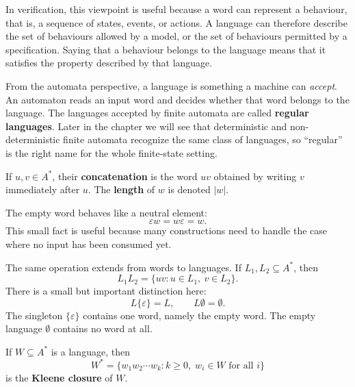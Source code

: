 In verification, this viewpoint is useful because a word can represent a
behaviour, that is, a sequence of states, events, or actions. A language
can therefore describe the set of behaviours allowed by a model, or the
set of behaviours permitted by a specification. Saying that a behaviour
belongs to the language means that it satisfies the property described by
that language.

From the automata perspective, a language is something a machine can
\emph{accept}.  An automaton reads an input word and decides whether that
word belongs to the language.  The languages accepted by finite automata
are called \textbf{regular languages}.  Later in the chapter we will see
that deterministic and non-deterministic finite automata recognize the
same class of languages, so ``regular'' is the right name for the whole
finite-state setting.


\begin{definition}
\label{def:word-ops}
If $u,v\in A^*$, their \textbf{concatenation} is the word $uv$
obtained by writing $v$ immediately after $u$.  The \textbf{length} of
$w$ is denoted $|w|$.
\end{definition}


The empty word behaves like a neutral element:
\[
  \varepsilon w = w\varepsilon = w.
\]
This small fact is useful because many constructions need to handle the
case where no input has been consumed yet.

The same operation extends from words to languages.  If
$L_1,L_2\subseteq A^*$, then
\[
  L_1L_2=\{uv:u\in L_1,\ v\in L_2\}.
\]
There is a small but important distinction here:
\[
  L\{\varepsilon\}=L,
  \qquad
  L\emptyset=\emptyset.
\]
The singleton $\{\varepsilon\}$ contains one word, namely the empty
word.  The empty language $\emptyset$ contains no word at all.

\begin{definition}
\label{def:kleene-star}
If $W \subseteq A^*$ is a language, then
\[
  W^* =
  \{w_1w_2\cdots w_k : k\geq 0,\; w_i\in W\text{ for all }i\}
\]
is the \textbf{Kleene closure} of $W$.
\end{definition}

